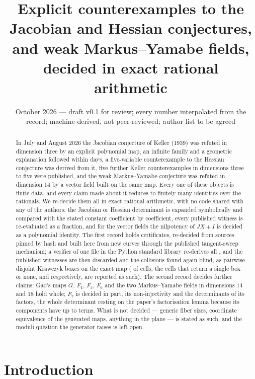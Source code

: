 \documentclass[11pt]{article}
\title{Explicit counterexamples to the Jacobian and Hessian conjectures,\\
and weak Markus--Yamabe fields,\\
decided in exact rational arithmetic}
\author{\cmauthor}
\date{October 2026 --- draft v0.1 for review; every number interpolated from the record; machine-derived, not peer-reviewed; author list to be agreed}
\begin{document}
\maketitle

\begin{abstract}
In July and August 2026 the Jacobian conjecture of Keller (1939) was refuted in dimension three
by an explicit polynomial map, an infinite family and a geometric explanation followed within
days, a five-variable counterexample to the Hessian conjecture was derived from it, five further
Keller counterexamples in dimensions three to five were published, and the weak Markus--Yamabe
conjecture was refuted in dimension $14$ by a vector field built on the same map. Every one of
these objects is finite data, and every claim made about it reduces to finitely many identities
over the rationals. We re-decide them all in exact rational arithmetic, with no code shared with
any of the authors: the Jacobian or Hessian determinant is expanded symbolically and compared
with the stated constant coefficient by coefficient, every published witness is re-evaluated as a
fraction, and for the vector fields the nilpotency of $JX+I$ is decided as a polynomial identity.
The first record holds \NCerts{} certificates, \NPublished{} re-decided from sources pinned by
hash and \NGenerated{} built here from new curves through the published tangent-sweep
mechanism; a verifier of one file in the Python standard library re-derives all \NCerts{}, and
the published witnesses are then discarded and the collisions found again blind, as pairwise
disjoint Krawczyk boxes on the exact map (\FibHits{} of \FibCells{} cells; the cells that
return a single box or none, \FibRejects{} and \FibRefused{} respectively, are reported as such). The second
record decides \PolyRows{} further claims: Gao's maps $G$, $F_4$, $F_5$, $F_6$ and the two
Markus--Yamabe fields in dimensions $14$ and $18$ hold whole; $F_7$ is decided in part, its
non-injectivity and the determinants of its factors, the whole determinant resting on the paper's
factorisation lemma because its components have up to \FsevenTermsMax{} terms. What is not
decided --- generic fiber sizes, coordinate equivalence of the generated maps, anything in the
plane --- is stated as such, and the moduli question the generator raises is left open.
\end{abstract}

\section{Introduction}
\end{document}
